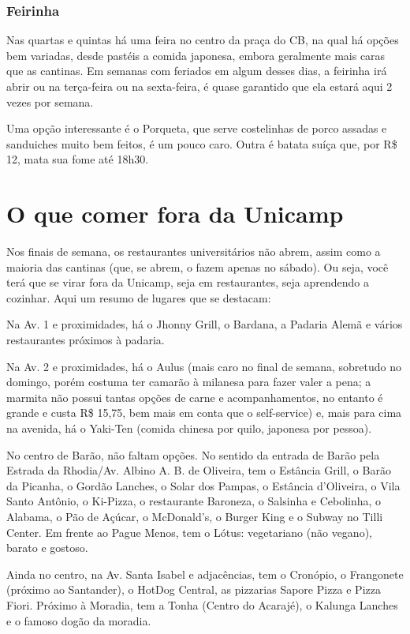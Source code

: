 \subsubsection{Feirinha}

Nas quartas e quintas há uma feira no centro da praça do CB, na qual há opções
bem variadas, desde pastéis a comida japonesa, embora geralmente mais caras que
as cantinas. Em semanas com feriados em algum desses dias, a feirinha irá abrir
ou na terça-feira ou na sexta-feira, é quase garantido que ela estará aqui 2
vezes por semana.

Uma opção interessante é o Porqueta, que serve costelinhas de porco assadas e
sanduiches muito bem feitos, é um pouco caro. Outra é batata suíça que, por
R\$ 12, mata sua fome até 18h30.

\section{O que comer fora da Unicamp}

Nos finais de semana, os restaurantes universitários não abrem, assim como a
maioria das cantinas (que, se abrem, o fazem apenas no sábado). Ou seja, você
terá que se virar fora da Unicamp, seja em restaurantes, seja aprendendo a
cozinhar. Aqui um resumo de lugares que se destacam:

Na Av. 1 e proximidades, há o Jhonny Grill, o Bardana, a Padaria Alemã e vários
restaurantes próximos à padaria.

Na Av. 2 e proximidades, há o Aulus (mais caro no final de semana, sobretudo no
domingo, porém costuma ter camarão à milanesa para fazer valer a pena; a
marmita não possui tantas opções de carne e acompanhamentos, no entanto é
grande e custa R\$ 15,75, bem mais em conta que o self-service) e, mais para
cima na avenida, há o Yaki-Ten (comida chinesa por quilo, japonesa por pessoa).

No centro de Barão, não faltam opções. No sentido da entrada de Barão pela
Estrada da Rhodia/Av. Albino A. B. de Oliveira, tem o Estância Grill, o Barão
da Picanha, o Gordão Lanches, o Solar dos Pampas, o Estância d'Oliveira, o Vila
Santo Antônio, o Ki-Pizza, o restaurante Baroneza, o Salsinha e Cebolinha, o
Alabama, o Pão de Açúcar, o McDonald's, o Burger King e o Subway no Tilli
Center. Em frente ao Pague Menos, tem o Lótus: vegetariano (não vegano), barato
e gostoso.

Ainda no centro, na Av. Santa Isabel e adjacências, tem o Cronópio, o
Frangonete (próximo ao Santander), o HotDog Central, as pizzarias Sapore Pizza
e Pizza Fiori. Próximo à Moradia, tem a Tonha (Centro do Acarajé), o Kalunga
Lanches e o famoso dogão da moradia.

